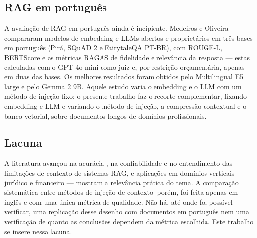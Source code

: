 \subsection{RAG em português}

A avaliação de RAG em português ainda é incipiente. Medeiros e Oliveira~\cite{medeiros2025embeddings} compararam modelos de embedding e LLMs abertos e proprietários em três bases em português (Pirá, SQuAD 2 e FairytaleQA PT-BR), com ROUGE-L, BERTScore e as métricas RAGAS de fidelidade e relevância da resposta --- estas calculadas com o GPT-4o-mini como juiz e, por restrição orçamentária, apenas em duas das bases. Os melhores resultados foram obtidos pelo Multilingual E5 large e pelo Gemma 2 9B. Aquele estudo varia o embedding e o LLM com um método de injeção fixo; o presente trabalho faz o recorte complementar, fixando embedding e LLM e variando o método de injeção, a compressão contextual e o banco vetorial, sobre documentos longos de domínios profissionais.

\subsection{Lacuna}

A literatura avançou na acurácia \cite{ma2023query, rackauckas2024ragfusion}, na confiabilidade \cite{andriopoulos2023augmenting, barnett2024seven} e no entendimento das limitações de contexto \cite{liu2023lost, nair2023drilling} de sistemas RAG, e aplicações em domínios verticais --- jurídico \cite{cui2023chatlaw} e financeiro \cite{gupta2023gptinvestar} --- mostram a relevância prática do tema. A comparação sistemática entre métodos de injeção de contexto, porém, foi feita apenas em inglês \cite{sakar2025rag} e com uma única métrica de qualidade. Não há, até onde foi possível verificar, uma replicação desse desenho com documentos em português nem uma verificação de quanto as conclusões dependem da métrica escolhida. Este trabalho se insere nessa lacuna.
